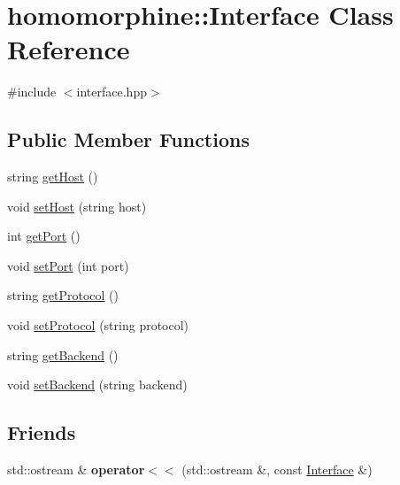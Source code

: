 \hypertarget{classhomomorphine_1_1_interface}{}\section{homomorphine\+::Interface Class Reference}
\label{classhomomorphine_1_1_interface}


{\ttfamily \#include $<$interface.\+hpp$>$}

\subsection*{Public Member Functions}
\begin{DoxyCompactItemize}
\item 
string \mbox{\hyperlink{classhomomorphine_1_1_interface_a2cd00479c3d14493d31362234f774db9}{get\+Host}} ()
\item 
void \mbox{\hyperlink{classhomomorphine_1_1_interface_aa250a3c50c6eb1236ca6ee978ab474f1}{set\+Host}} (string host)
\item 
int \mbox{\hyperlink{classhomomorphine_1_1_interface_a4433e13909f0e96ab45eeeb9ced8ac56}{get\+Port}} ()
\item 
void \mbox{\hyperlink{classhomomorphine_1_1_interface_a3027f79fe84b8ce6d8d3084771c41e4f}{set\+Port}} (int port)
\item 
string \mbox{\hyperlink{classhomomorphine_1_1_interface_afa73852700146c2957b425c8c0b19c55}{get\+Protocol}} ()
\item 
void \mbox{\hyperlink{classhomomorphine_1_1_interface_a7c4a929fc543c3a5438a5d6f6b3dbc16}{set\+Protocol}} (string protocol)
\item 
string \mbox{\hyperlink{classhomomorphine_1_1_interface_aa52801359888c6758cd4a75d6804eb1e}{get\+Backend}} ()
\item 
void \mbox{\hyperlink{classhomomorphine_1_1_interface_a46885f3cab9a833941201dceb370a6f4}{set\+Backend}} (string backend)
\end{DoxyCompactItemize}
\subsection*{Friends}
\begin{DoxyCompactItemize}
\item 
\mbox{\label{classhomomorphine_1_1_interface_ae9184a9fcf19546e0663208ff46f3c37}} 
std\+::ostream \& {\bfseries operator$<$$<$} (std\+::ostream \&, const \mbox{\hyperlink{classhomomorphine_1_1_interface}{Interface}} \&)
\end{DoxyCompactItemize}


